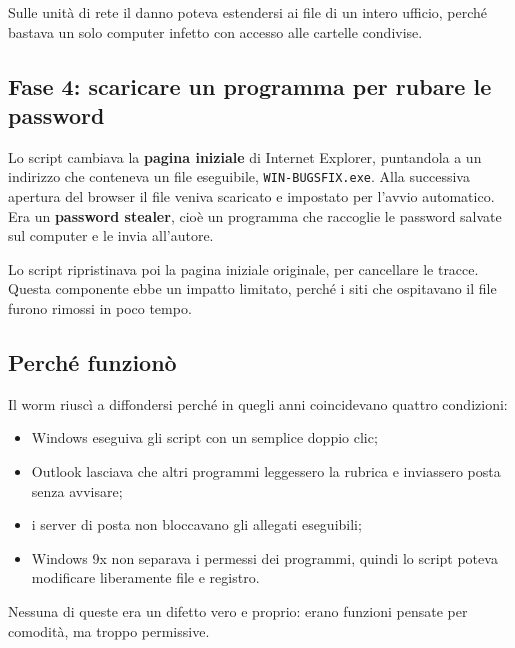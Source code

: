 Sulle unità di rete il danno poteva estendersi ai file di un intero ufficio, perché bastava un solo computer infetto con accesso alle cartelle condivise.

\subsection{Fase 4: scaricare un programma per rubare le password}

Lo script cambiava la \textbf{pagina iniziale} di Internet Explorer, puntandola a un indirizzo che conteneva un file eseguibile, \texttt{WIN-BUGSFIX.exe}. Alla successiva apertura del browser il file veniva scaricato e impostato per l'avvio automatico. Era un \textbf{password stealer}, cioè un programma che raccoglie le password salvate sul computer e le invia all'autore.

Lo script ripristinava poi la pagina iniziale originale, per cancellare le tracce. Questa componente ebbe un impatto limitato, perché i siti che ospitavano il file furono rimossi in poco tempo.

\subsection{Perché funzionò}

Il worm riuscì a diffondersi perché in quegli anni coincidevano quattro condizioni:

\begin{itemize}
    \item Windows eseguiva gli script con un semplice doppio clic;
    \item Outlook lasciava che altri programmi leggessero la rubrica e inviassero posta senza avvisare;
    \item i server di posta non bloccavano gli allegati eseguibili;
    \item Windows 9x non separava i permessi dei programmi, quindi lo script poteva modificare liberamente file e registro.
\end{itemize}

Nessuna di queste era un difetto vero e proprio: erano funzioni pensate per comodità, ma troppo permissive.
